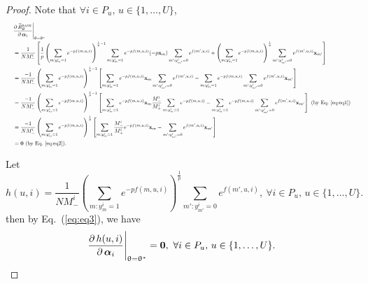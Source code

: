 \begin{proof}
Note that $\forall i \in P_u, \, u \in \{1,\dots,U\}$,
\begin{equation}
\label{eq:eq3}
\resizebox{\textwidth}{!}{$
\begin{aligned}
&\frac{\partial \, \widetilde R_{\uptheta}^{\textsc{rank}}} {\partial \, \alphabm_i} \Bigg|_{\uptheta = \uptheta^*} \\
&= \frac{1}{N M_-^i} \left[
   \frac{1}{p} \left( \sum_{m: y_m^i = 1} e^{-p f(m, u, i)} \right)^{\frac{1}{p} - 1} 
   \sum_{m: y_m^i = 1} e^{-p f(m, u, i)} (-p \x_m) 
   \sum_{m': y_{m'}^i = 0} e^{f(m', u, i)} + 
   \left( \sum_{m: y_m^i = 1} e^{-p f(m, u, i)} \right)^\frac{1}{p}
   \sum_{m': y_{m'}^i = 0} e^{f(m', u, i)} \x_{m'} \right] \\
&= \frac{-1}{N M_-^i}
   \left( \sum_{m: y_m^i = 1} e^{-p f(m, u, i)} \right)^{\frac{1}{p} - 1} 
   \left[
   \sum_{m: y_m^i = 1} e^{-p f(m, u, i)} \x_m 
   \sum_{m': y_{m'}^i = 0} e^{f(m', u, i)} -
   \sum_{m: y_m^i = 1} e^{-p f(m, u, i)}
   \sum_{m': y_{m'}^i = 0} e^{f(m', u, i)} \x_{m'} \right] \\
&= \frac{-1}{N M_-^i}
   \left( \sum_{m: y_m^i = 1} e^{-p f(m, u, i)} \right)^{\frac{1}{p} - 1} 
   \left[
   \sum_{m: y_m^i = 1} e^{-p f(m, u, i)} \x_m 
   \frac{M_-^i}{M_+^i} \sum_{m: y_m^i = 1} e^{-p f(m, u, i)} -
   \sum_{m: y_m^i = 1} e^{-p f(m, u, i)}
   \sum_{m': y_{m'}^i = 0} e^{f(m', u, i)} \x_{m'} \right] \ (\text{by Eq.~\ref{eq:eq1}}) \\
&= \frac{-1}{N M_-^i}
   \left( \sum_{m: y_m^i = 1} e^{-p f(m, u, i)} \right)^\frac{1}{p}
   \left[
   \sum_{m: y_m^i = 1} \frac{M_-^i}{M_+^i} e^{-p f(m, u, i)} \x_m -
   \sum_{m': y_{m'}^i = 0} e^{f(m', u, i)} \x_{m'} \right] \\
&= \zero \ (\text{by Eq.~\ref{eq:eq2}}).
\end{aligned}
$}
\end{equation}

Let 
\begin{equation*}
h(u, i) 
= \frac{1}{N M_-^i} \left( \sum_{m: y_m^i = 1} e^{-p f(m, u, i)} \right)^\frac{1}{p} 
  \sum_{m': y_{m'}^i = 0} e^{f(m', u, i)},
\ \forall i \in P_u, \, u \in \{1,\dots,U\}.
\end{equation*}
then by Eq.~(\ref{eq:eq3}), we have
\begin{equation}
\label{eq:eq4}
\frac{\partial \, h(u, i)}{\partial \, {\bm{\alpha}}_i} \Bigg|_{\uptheta = \uptheta^*} = \mathbf{0},
\ \forall i \in P_u, \, u \in \{1,\dots,U\}.
\end{equation}


\end{proof}

